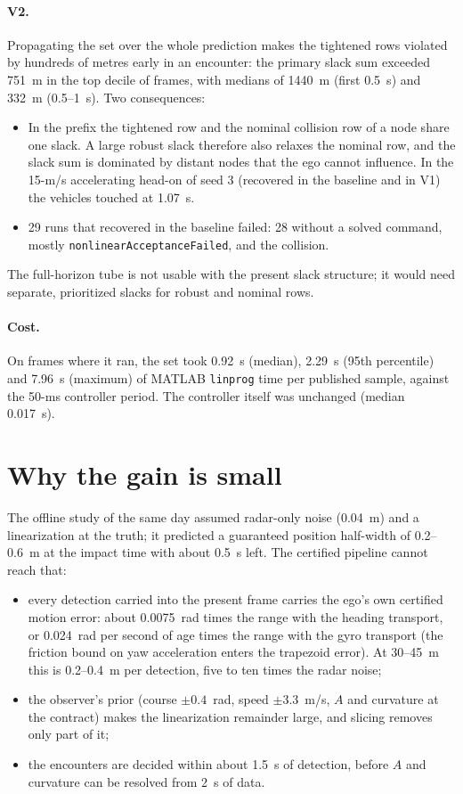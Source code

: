 \documentclass[11pt]{article}
\begin{document}
\paragraph{V2.} Propagating the set over the whole prediction makes the
tightened rows violated by hundreds of metres early in an encounter: the
primary slack sum exceeded 751~m in the top decile of frames, with medians of
1440~m (first 0.5~s) and 332~m (0.5--1~s). Two consequences:
\begin{itemize}
\item In the prefix the tightened row and the nominal collision row of a node
  share one slack. A large robust slack therefore also relaxes the nominal row,
  and the slack sum is dominated by distant nodes that the ego cannot
  influence. In the 15-m/s accelerating head-on of seed 3 (recovered in the
  baseline and in V1) the vehicles touched at 1.07~s.
\item 29 runs that recovered in the baseline failed: 28 without a solved
  command, mostly \texttt{nonlinearAcceptanceFailed}, and the collision.
\end{itemize}
The full-horizon tube is not usable with the present slack structure; it would
need separate, prioritized slacks for robust and nominal rows.

\paragraph{Cost.} On frames where it ran, the set took 0.92~s (median), 2.29~s
(95th percentile) and 7.96~s (maximum) of MATLAB \texttt{linprog} time per
published sample, against the 50-ms controller period. The controller itself
was unchanged (median 0.017~s).

\section{Why the gain is small}
The offline study of the same day assumed radar-only noise (0.04~m) and a
linearization at the truth; it predicted a guaranteed position half-width of
0.2--0.6~m at the impact time with about 0.5~s left. The certified pipeline
cannot reach that:
\begin{itemize}
\item every detection carried into the present frame carries the ego's own
  certified motion error: about 0.0075~rad times the range with the heading
  transport, or 0.024~rad per second of age times the range with the gyro
  transport (the friction bound on yaw acceleration enters the trapezoid
  error). At 30--45~m this is 0.2--0.4~m per detection, five to ten times the
  radar noise;
\item the observer's prior (course $\pm0.4$~rad, speed $\pm3.3$~m/s, $A$ and
  curvature at the contract) makes the linearization remainder large, and
  slicing removes only part of it;
\item the encounters are decided within about 1.5~s of detection, before $A$
  and curvature can be resolved from 2~s of data.
\end{itemize}
\end{document}
